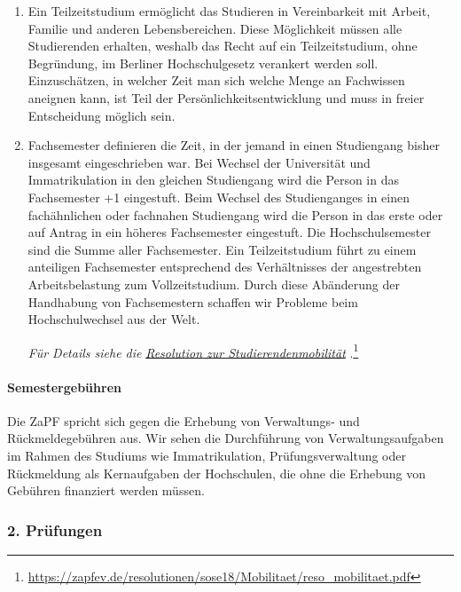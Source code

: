 \documentclass[DIV=calc]{scrartcl}
\begin{document}
\begin{enumerate}
\item Ein Teilzeitstudium ermöglicht das Studieren in Vereinbarkeit mit Arbeit, Familie und anderen Lebensbereichen. Diese Möglichkeit müssen alle Studierenden erhalten, weshalb das Recht auf ein Teilzeitstudium, ohne Begründung, im Berliner Hochschulgesetz verankert werden soll. Einzuschätzen, in welcher Zeit man sich welche Menge an Fachwissen aneignen kann, ist Teil der Persönlichkeitsentwicklung und muss in freier Entscheidung möglich sein.

\item Fachsemester definieren die Zeit, in der jemand in einen Studiengang bisher insgesamt eingeschrieben war. Bei Wechsel der Universität und Immatrikulation in den gleichen Studiengang wird die Person in das Fachsemester +1 eingestuft. Beim Wechsel des Studienganges in einen fachähnlichen oder fachnahen Studiengang wird die Person in das erste oder auf Antrag in ein höheres Fachsemester eingestuft. Die Hochschulsemester sind die Summe aller Fachsemester. Ein Teilzeitstudium führt zu einem anteiligen Fachsemester entsprechend des Verhältnisses der angestrebten Arbeitsbelastung zum Vollzeitstudium. Durch diese Abänderung der Handhabung von Fachsemestern schaffen wir Probleme beim Hochschulwechsel aus der Welt.

  \emph{Für Details siehe die
    }\href{https://zapfev.de/resolutionen/sose18/Mobilitaet/reso_mobilitaet.pdf}{\emph{Resolution zur Studierendenmobilität}}
.\footnote{\url{https://zapfev.de/resolutionen/sose18/Mobilitaet/reso_mobilitaet.pdf}}
  \end{enumerate}

\hypertarget{semestergebuxfchren}{%
\paragraph{Semestergebühren}\label{semestergebuxfchren}}

Die ZaPF spricht sich gegen die Erhebung von Verwaltungs- und
Rückmeldegebühren aus. Wir sehen die Durchführung von
Verwaltungsaufgaben im Rahmen des Studiums wie Immatrikulation,
Prüfungsverwaltung oder Rückmeldung als Kernaufgaben der
Hochschulen, die ohne die Erhebung von Gebühren finanziert werden
müssen.


\hypertarget{pruxfcfungen}{%
\subsubsection*{2. Prüfungen}\label{pruxfcfungen}}
\end{document}
